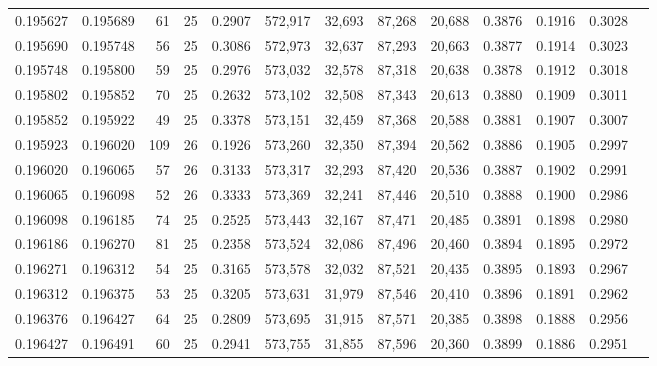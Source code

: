 \begin{tabular}{rrrrrrrrrrrrr}
0.195627 & 0.195689 &  61 &  25 &                                     0.2907 & 572,917 &  32,693 &  87,268 &  20,688 & 0.3876 & 0.1916 & 0.3028 \\
0.195690 & 0.195748 &  56 &  25 &                                     0.3086 & 572,973 &  32,637 &  87,293 &  20,663 & 0.3877 & 0.1914 & 0.3023 \\
0.195748 & 0.195800 &  59 &  25 &                                     0.2976 & 573,032 &  32,578 &  87,318 &  20,638 & 0.3878 & 0.1912 & 0.3018 \\
0.195802 & 0.195852 &  70 &  25 &                                     0.2632 & 573,102 &  32,508 &  87,343 &  20,613 & 0.3880 & 0.1909 & 0.3011 \\
0.195852 & 0.195922 &  49 &  25 &                                     0.3378 & 573,151 &  32,459 &  87,368 &  20,588 & 0.3881 & 0.1907 & 0.3007 \\
0.195923 & 0.196020 & 109 &  26 &                                     0.1926 & 573,260 &  32,350 &  87,394 &  20,562 & 0.3886 & 0.1905 & 0.2997 \\
0.196020 & 0.196065 &  57 &  26 &                                     0.3133 & 573,317 &  32,293 &  87,420 &  20,536 & 0.3887 & 0.1902 & 0.2991 \\
0.196065 & 0.196098 &  52 &  26 &                                     0.3333 & 573,369 &  32,241 &  87,446 &  20,510 & 0.3888 & 0.1900 & 0.2986 \\
0.196098 & 0.196185 &  74 &  25 &                                     0.2525 & 573,443 &  32,167 &  87,471 &  20,485 & 0.3891 & 0.1898 & 0.2980 \\
0.196186 & 0.196270 &  81 &  25 &                                     0.2358 & 573,524 &  32,086 &  87,496 &  20,460 & 0.3894 & 0.1895 & 0.2972 \\
0.196271 & 0.196312 &  54 &  25 &                                     0.3165 & 573,578 &  32,032 &  87,521 &  20,435 & 0.3895 & 0.1893 & 0.2967 \\
0.196312 & 0.196375 &  53 &  25 &                                     0.3205 & 573,631 &  31,979 &  87,546 &  20,410 & 0.3896 & 0.1891 & 0.2962 \\
0.196376 & 0.196427 &  64 &  25 &                                     0.2809 & 573,695 &  31,915 &  87,571 &  20,385 & 0.3898 & 0.1888 & 0.2956 \\
0.196427 & 0.196491 &  60 &  25 &                                     0.2941 & 573,755 &  31,855 &  87,596 &  20,360 & 0.3899 & 0.1886 & 0.2951 \\

\end{tabular}
